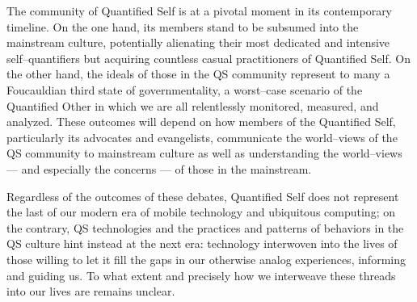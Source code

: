 \documentclass{article}
\begin{document}
The community of Quantified Self is at a pivotal moment in its contemporary timeline.
On the one hand,
its members stand to be subsumed into the mainstream culture,
potentially alienating their most dedicated and intensive self--quantifiers but acquiring countless casual practitioners of Quantified Self.
On the other hand,
the ideals of those in the QS community represent to many a Foucauldian third state of governmentality,
a worst--case scenario of the Quantified Other in which we are all relentlessly monitored,
measured,
and analyzed.
These outcomes will depend on how members of the Quantified Self,
particularly its advocates and evangelists,
communicate the world--views of the QS community to mainstream culture as well as understanding the world--views
--- and especially the concerns ---
of those in the mainstream.

Regardless of the outcomes of these debates,
Quantified Self does not represent the last of our modern era of mobile technology and ubiquitous computing;
on the contrary,
QS technologies and the practices and patterns of behaviors in the QS culture hint instead at the next era:
technology interwoven into the lives of those willing to let it fill the gaps in our otherwise analog experiences,
informing and guiding us.
To what extent and precisely how we interweave these threads into our lives are remains unclear.

\printbibliography{}
\end{document}
